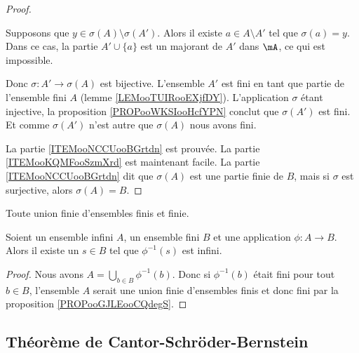 \begin{proof}
\begin{subproof}
		Supposons que \( y\in\sigma(A)\setminus\sigma(A')\). Alors il existe \( a\in A\setminus A'\) tel que \( \sigma(a)=y\). Dans ce cas, la partie \( A'\cup\{ a \}\) est un majorant de \( A'\) dans \( \mA\), ce qui est impossible.

		Donc \( \sigma\colon A'\to \sigma(A)\) est bijective.
		\spitem[Conclusion]
		L'ensemble \( A'\) est fini en tant que partie de l'ensemble fini \( A\) (lemme \ref{LEMooTUIRooEXjfDY}). L'application \( \sigma\) étant injective, la proposition \ref{PROPooWKSIooHcfYPN} conclut que \( \sigma(A')\) est fini. Et comme \( \sigma(A')\) n'est autre que \( \sigma(A)\) nous avons fini.
	\end{subproof}
	La partie \ref{ITEMooNCCUooBGrtdn} est prouvée. La partie \ref{ITEMooKQMFooSzmXrd} est maintenant facile. La partie \ref{ITEMooNCCUooBGrtdn} dit que \( \sigma(A)\) est une partie finie de \( B\), mais si \( \sigma\) est surjective, alors \( \sigma(A)=B\).
\end{proof}

\begin{proposition}	\label{PROPooGJLEooCQdegS}
	Toute union finie d'ensembles finis et finie.
\end{proposition}


\begin{proposition}	\label{PROPooYCDWooXBWVrW}
	Soient un ensemble infini \( A\), un ensemble fini \( B\) et une application \(\phi \colon A\to B  \). Alors il existe un \( s\in B\) tel que \( \phi^{-1}(s)\) est infini.
\end{proposition}

\begin{proof}
	Nous avons \( A=\bigcup_{b\in B}\phi^{-1}(b)\). Donc si \( \phi^{-1}(b)\) était fini pour tout \( b\in B\), l'ensemble \( A\) serait une union finie d'ensembles finis et donc fini par la proposition \ref{PROPooGJLEooCQdegS}.
\end{proof}

\subsection{Théorème de Cantor-Schröder-Bernstein}
\label{SUBooCantorSchroderBernstein}

